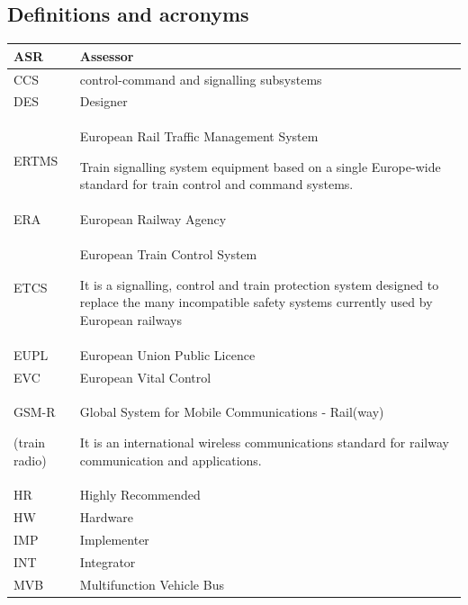 \documentclass{template/openetcs_article}
\begin{document}


\subsection{Definitions and acronyms}
\tablehead{}
\tabletail{}
\tablelasttail{}
\begin{supertabular}{|m{3cm}m{11cm}|}
\hline
ASR &
Assessor\\\hline
CCS &
control-command and signalling subsystems  \\\hline
DES &
Designer\\\hline
ERTMS &
European Rail Traffic Management System

Train signalling system equipment based on a single Europe-wide standard for train control and command systems.\\\hline
ERA &
European Railway Agency\\\hline
ETCS &
European Train Control System

It is a signalling, control and train protection system designed to replace the many incompatible safety systems currently used by European railways\\\hline
EUPL &
European Union Public Licence\\\hline
EVC &
European Vital Control\\\hline
GSM-R

(train radio) &
Global System for Mobile Communications - Rail(way)

It is an international wireless communications standard for railway communication and applications.\\\hline
HR &
Highly Recommended\\\hline
HW &
Hardware\\\hline
IMP &
Implementer\\\hline
INT &
Integrator\\\hline
MVB &
Multifunction Vehicle Bus


\end{supertabular}
\end{document}
